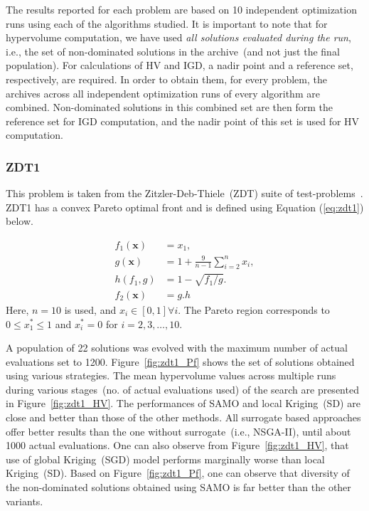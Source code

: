 The results reported for each problem are based on 10 independent optimization runs using each of the algorithms studied. It is important to note that for hypervolume computation, we have used \textit{all solutions evaluated during the run}, i.e., the set of non-dominated solutions in the archive~(and not just the final population). For calculations of HV and IGD, a nadir point and a reference set, respectively, are required. In order to obtain them, for every problem, the archives across all independent optimization runs of every algorithm are combined. Non-dominated solutions in this combined set are then form the reference set for IGD computation, and the nadir point of this set is used for HV computation.

\subsubsection{ZDT1}
This problem is taken from the Zitzler-Deb-Thiele~(ZDT) suite of test-problems~\cite{zitzler2000mo}. ZDT1 has a convex Pareto optimal front and is defined using Equation (\ref{eq:zdt1}) below.

\begin{equation} 
\label{eq:zdt1}
\begin{split}
f_1(\mathbf{x}) & = x_1, \\
g(\mathbf{x}) & = 1 + \frac{9}{n-1} \sum_{i=2}^n x_i, \\
h(f_1, g) & = 1 - \sqrt{f_1 / g}.\\
f_2(\mathbf{x}) & = g.h
\end{split}
\end{equation}
Here, $n=10$ is used, and $x_i \in [0,1]\forall i$.
The Pareto region corresponds to $0 \leq x_1^* \leq 1$ and $x_i^* = 0$ for
$i = 2,3,\ldots,10$. 

A population of 22 solutions was evolved with the maximum number of actual evaluations set to 1200. Figure~\ref{fig:zdt1_Pf} shows the set of solutions obtained using various strategies. The mean hypervolume values across multiple runs during various stages~(no. of actual evaluations used) of the search are presented in Figure~\ref{fig:zdt1_HV}. The performances of SAMO and local Kriging~(SD) are close and better than those of the other methods. All surrogate based approaches offer better results than the one without surrogate~(i.e., NSGA-II), until about 1000 actual evaluations. One can also observe from Figure~\ref{fig:zdt1_HV}, that use of global Kriging~(SGD) model performs marginally worse than local Kriging~(SD). Based on Figure~\ref{fig:zdt1_Pf}, one can observe that diversity of the non-dominated solutions obtained using SAMO is far better than the other variants.

